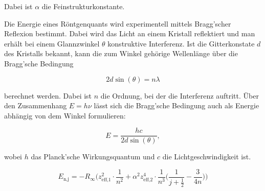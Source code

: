 Dabei ist $\alpha$ die Feinstrukturkonstante.

Die Energie eines Röntgenquants wird experimentell mittels Bragg'scher Reflexion bestimmt.
Dabei wird das Licht an einem Kristall reflektiert und man erhält bei einem Glannzwinkel $\theta$ konstruktive Interferenz.
Ist die Gitterkonstate $d$ des Kristalls bekannt, kann die zum Winkel gehörige Wellenlänge über die Bragg'sche Bedingung

\begin{equation}
    \label{eqn:bragg}
    2 d \sin (\theta) = n \lambda
\end{equation}

berechnet werden. Dabei ist $n$ die Ordnung, bei der die Interferenz auftritt.
Über den Zusammenhang $E = h \nu$ lässt sich die Bragg'sche Bedingung auch als Energie abhängig von dem Winkel formulieren:

\begin{equation}
    \label{eqn:bragg-energie}
    E = \frac{h c}{2 d \sin (\theta )},
\end{equation}

wobei $h$ das Planck'sche Wirkungsquantum und $c$ die Lichtgeschwindigkeit ist.


\begin{equation}
    \label{eqn:fein-struktur}
    E_\text{n,j} = -R_\infty \bigg( z_\text{eff,1}^2 \cdot \frac{1}{n^2} + \alpha^2 z_\text{eff,2}^4 \cdot \frac{1}{n^3} \bigg( \frac{1}{j + \frac{1}{2}} - \frac{3}{4n} \bigg) \bigg)
\end{equation}